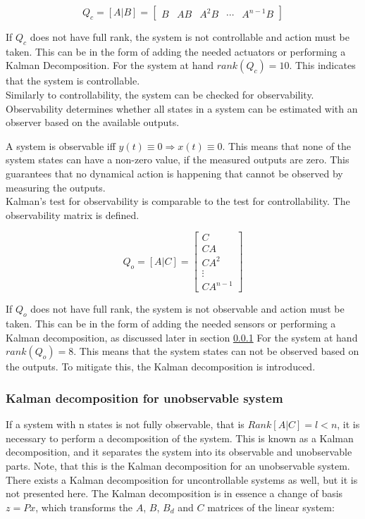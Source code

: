 \begin{equation} \label{eq:ctrb}
	Q_c = [A|B] = \begin{bmatrix}  B & AB & A^2B & \cdots & A^{n-1}B  \end{bmatrix}
\end{equation}

If $Q_c$ does not have full rank, the system is not controllable and action must be taken. This can be in the form of adding the needed actuators or performing a Kalman Decomposition. For the system at hand $ rank(Q_c) = 10 $. This indicates that the system is controllable.\\

Similarly to controllability, the system can be checked for observability. Observability determines whether all states in a system can be estimated with an observer based on the available outputs. 

\noindent A system is observable iff $y(t) \equiv 0 \Rightarrow x(t) \equiv 0$. This means that none of the system states can have a non-zero value, if the measured outputs are zero. This guarantees that no dynamical action is happening that cannot be observed by measuring the outputs.\\

Kalman's test for observability is comparable to the test for controllability. The observability matrix is defined.

\begin{equation}
	Q_o = [A|C] = \begin{bmatrix}
		C \\ CA \\ CA^2 \\ \vdots \\ CA^{n-1}
	\end{bmatrix}
\end{equation}

If $Q_o$ does not have full rank, the system is not observable and action must be taken. This can be in the form of adding the needed sensors or performing a Kalman decomposition, as discussed later in section \cref{sec:kalman}
For the system at hand $ rank(Q_o) = 8 $. This means that the system states can not be observed based on the outputs. To mitigate this, the Kalman decomposition is introduced.

\subsubsection{Kalman decomposition for unobservable system} \label{sec:kalman}
If a system with n states is not fully observable, that is $Rank[A|C] = l < n$, it is necessary to perform a decomposition of the system. This is known as a Kalman decomposition, and it separates the system into its observable and unobservable parts. Note, that this is the Kalman decomposition for an unobservable system. There exists a Kalman decomposition for uncontrollable systems as well, but it is not presented here. The Kalman decomposition is in essence a change of basis $z=Px$, which transforms the $A$, $B$, $B_d$ and $C$ matrices of the linear system:


